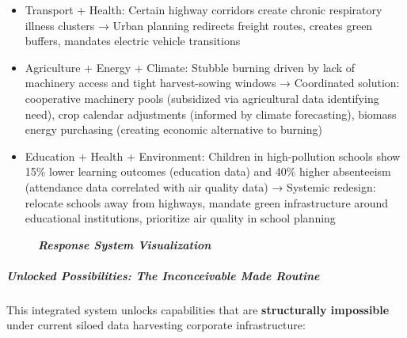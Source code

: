 \begin{enumerate}
  \begin{itemize}
  \tightlist
  \item
    Transport + Health: Certain highway corridors create chronic
    respiratory illness clusters → Urban planning redirects freight
    routes, creates green buffers, mandates electric vehicle transitions
  \item
    Agriculture + Energy + Climate: Stubble burning driven by lack of
    machinery access and tight harvest-sowing windows → Coordinated
    solution: cooperative machinery pools (subsidized via agricultural
    data identifying need), crop calendar adjustments (informed by
    climate forecasting), biomass energy purchasing (creating economic
    alternative to burning)
  \item
    Education + Health + Environment: Children in high-pollution schools
    show 15\% lower learning outcomes (education data) and 40\% higher
    absenteeism (attendance data correlated with air quality data) →
    Systemic redesign: relocate schools away from highways, mandate
    green infrastructure around educational institutions, prioritize air
    quality in school planning
  \end{itemize}
\end{enumerate}

\begin{figure}
\centering
\pandocbounded{}
\caption{\textbf{\emph{Response System Visualization}}}
\end{figure}

\subparagraph{Unlocked Possibilities: The Inconceivable Made
Routine}\label{unlocked-possibilities-the-inconceivable-made-routine}

This integrated system unlocks capabilities that are
\textbf{structurally impossible} under current siloed data harvesting
corporate infrastructure:

